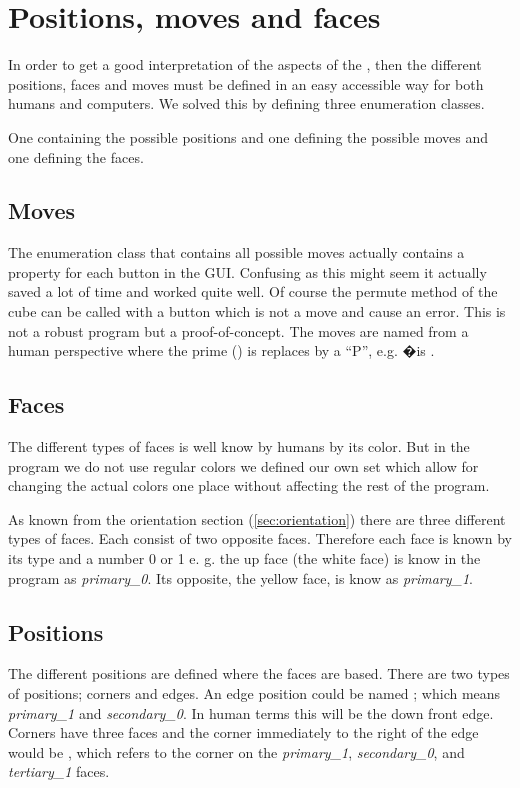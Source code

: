 \section{Positions, moves and faces}
In order to get a good interpretation of the aspects of the \cube{}, then the different positions, faces and moves must be defined in an easy accessible way for both humans and computers. We solved this by defining three enumeration classes. 

One containing the possible positions and one defining the possible moves and one defining the faces.

\subsection{Moves}
The enumeration class that contains all possible moves actually contains a property for each button in the GUI. Confusing as this might seem it actually saved a lot of time and worked quite well. Of course the permute method of the cube can be called with a button which is not a move and cause an error. This is not a robust program but a proof-of-concept. 
The moves are named from a human perspective where the prime () is replaces by a ``P'', e.g. �is .

\subsection{Faces}
The different types of faces is well know by humans by its color.
But in the program we do not use regular colors we defined our own set which allow for changing the actual colors one place without affecting the rest of the program. 

As known from the orientation section (\ref{sec:orientation}) there are three different types of faces.
Each consist of two opposite faces. Therefore each face is known by its type and a number 0 or 1 e. g. the up face (the white face) is know in the program as \textit{primary\_0}.
Its opposite, the yellow face, is know as \textit{primary\_1}. 

\subsection{Positions}
The different positions are defined where the faces are based. There are two types of positions; corners and edges.
An edge position could be named ; which means \textit{primary\_1} and \textit{secondary\_0}.
In human terms this will be the down front edge.
Corners have three faces and the corner immediately to the right of the edge would be , which refers to the corner on the \textit{primary\_1}, \textit{secondary\_0}, and \textit{tertiary\_1} faces.
